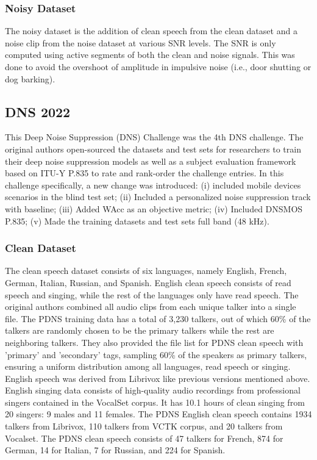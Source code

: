 \subsubsection{Noisy Dataset}
The noisy dataset is the addition of clean speech from the clean dataset and a noise clip from the noise dataset at various SNR levels. The SNR is only computed using active segments of both the clean and noise signals. This was done to avoid the overshoot of amplitude in impulsive noise (i.e., door shutting or dog barking).

\subsection{DNS 2022 \cite{dubey2022}}
This Deep Noise Suppression (DNS) Challenge was the 4th DNS challenge. The original authors open-sourced the datasets and test sets for researchers to train their deep noise suppression models as well as a subject evaluation framework based on ITU-Y P.835 to rate and rank-order the challenge entries. In this challenge specifically, a new change was introduced: (i) included mobile devices scenarios in the blind test set;  (ii) Included a personalized noise suppression track with baseline; (iii) Added WAcc as an objective metric; (iv) Included DNSMOS P.835; (v) Made the training datasets and test sets full band (48 kHz).
\subsubsection{Clean Dataset}
The clean speech dataset consists of six languages, namely English, French, German, Italian, Russian, and Spanish. English clean speech consists of read speech and singing, while the rest of the languages only have read speech. The original authors combined all audio clips from each unique talker into a single file. The PDNS training data has a total of 3,230 talkers, out of which 60\% of the talkers are randomly chosen to be the primary talkers while the rest are neighboring talkers. They also provided the file list for PDNS clean speech with 'primary' and 'secondary' tags, sampling 60\% of the speakers as primary talkers, ensuring a uniform distribution among all languages, read speech or singing.
English speech was derived from Librivox like previous versions mentioned above. English singing data consists of high-quality audio recordings from professional singers contained in the VocalSet corpus.
It has 10.1 hours of clean singing from 20 singers: 9 males and 11 females.
The PDNS English clean speech contains 1934 talkers from Librivox, 110 talkers from VCTK corpus, and 20 talkers from Vocalset. The PDNS clean speech consists of 47 talkers for French, 874 for German, 14 for Italian, 7 for Russian, and 224 for Spanish.
